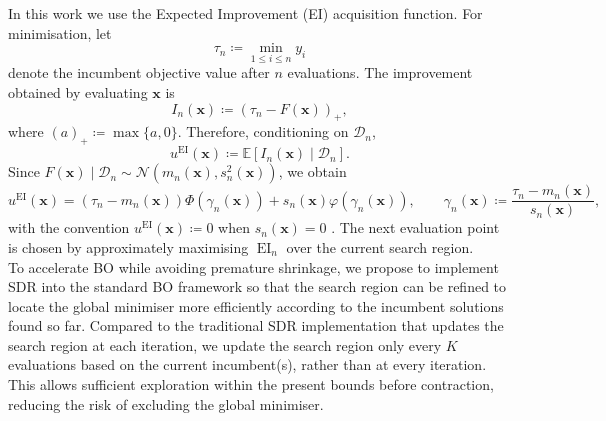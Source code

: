 \documentclass[pdflatex,sn-mathphys-num]{sn-jnl}%
\theoremstyle{thmstyleone}%
\theoremstyle{thmstyletwo}%
\theoremstyle{thmstylethree}%
\begin{document}
In this work we use the Expected Improvement (EI) acquisition function. For minimisation, let
\[
    \tau_n \coloneq \min_{1\le i\le n} y_i
\]
denote the incumbent objective value after \(n\) evaluations. The improvement obtained by evaluating \(\mathbf x\) is
\[
    I_n(\mathbf x)\coloneq(\tau_n-F(\mathbf x))_+,
\]
where \((a)_+ \coloneq \max\{a,0\}\). Therefore, conditioning on $\mathcal{D}_n$,
\[
    u^{\operatorname{EI}}(\mathbf x)
    \coloneq
    \mathbb E[I_n(\mathbf x)\mid\mathcal D_n].
\]
Since \(F(\mathbf x)\mid\mathcal D_n\sim \mathcal N(m_n(\mathbf x),s_n^2(\mathbf x))\), we obtain
\[
    u^{\operatorname{EI}}(\mathbf x)
    =
    (\tau_n-m_n(\mathbf x))\Phi(\gamma_n(\mathbf x))
    +
    s_n(\mathbf x)\varphi(\gamma_n(\mathbf x)),
    \qquad
    \gamma_n(\mathbf x)
    \coloneq
    \frac{\tau_n-m_n(\mathbf x)}{s_n(\mathbf x)},
\]
with the convention \(u^{\operatorname{EI}}(\mathbf x) \coloneq 0\) when \( s_n(\mathbf{x}) = 0\) \cite{Mockus1978}. The next evaluation point is chosen by approximately maximising \(\operatorname{EI}_n\) over the current search region.\\

To accelerate BO while avoiding premature shrinkage, we propose to implement SDR \cite{SDR} into the standard BO framework so that the search region can be refined to locate the global minimiser more efficiently according to the incumbent solutions found so far. Compared to the traditional SDR implementation that updates the search region at each iteration, we update the search region only every \(K\) evaluations based on the current incumbent(s), rather than at every iteration. This allows sufficient exploration within the present bounds before contraction, reducing the risk of excluding the global minimiser.
\end{document}
